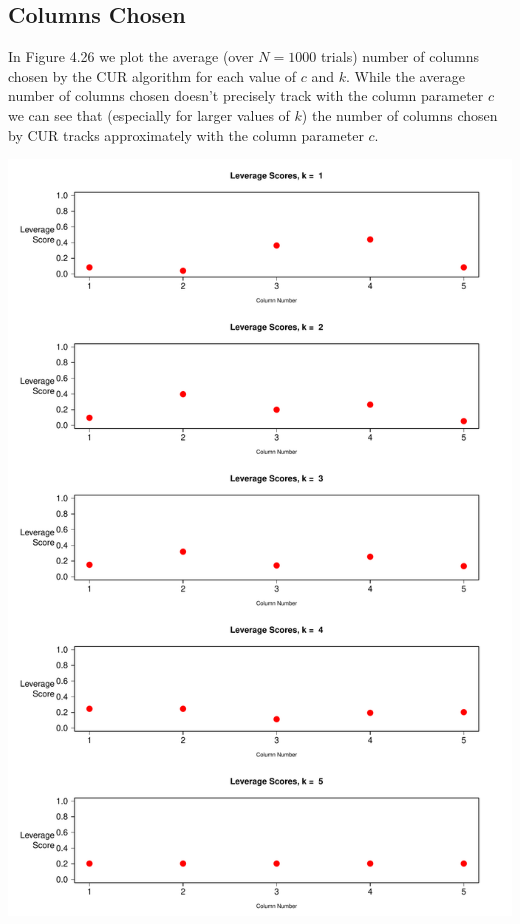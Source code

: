 \documentclass{book}
\begin{document}
\subsection{Columns Chosen}

In Figure 4.26 we plot the average (over $N=1000$ trials) number of columns chosen by the CUR algorithm for each value of $c$ and $k$. While the average number of columns chosen doesn't precisely track with the column parameter $c$ we can see that (especially for larger values of $k$) the number of columns chosen by CUR tracks approximately with the column parameter $c$. 


\newpage
\begin{center}
\includegraphics[scale=.63]{./Figures/crabs/levs.pdf}
\end{center}
\end{document}
